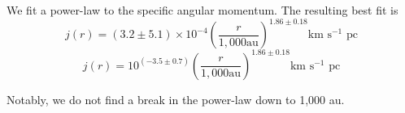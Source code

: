 We fit a power-law to the specific angular momentum. 
The resulting best fit is 
\begin{equation}
j(r) = (3.2\pm5.1)\times 10^{-4}\left( \frac{r}{1,000 \textrm{au}}\right)^{1.86\pm0.18} \textrm{km s$^{-1}$ pc}
\end{equation}
\begin{equation}
j(r) = 10^{(-3.5\pm 0.7)}\left( \frac{r}{1,000 \textrm{au}}\right)^{1.86\pm0.18} \textrm{km s$^{-1}$ pc}
\end{equation}
  
Notably, we do not find a break in the power-law down to 1,000 au.
  
  
  